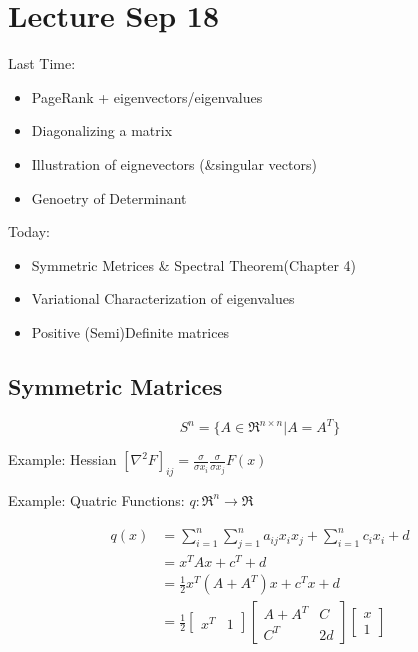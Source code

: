 \section{Lecture Sep 18}

Last Time:

\begin{itemize}
	\item PageRank + eigenvectors/eigenvalues
	
	\item Diagonalizing a matrix
	
	\item Illustration of eignevectors (\&singular vectors)
	
	\item Genoetry of Determinant 
\end{itemize}


Today:

\begin{itemize}
	\item Symmetric Metrices \& Spectral Theorem(Chapter 4)
	
	\item Variational Characterization of eigenvalues
	
	\item Positive (Semi)Definite matrices
\end{itemize}

\subsection{Symmetric Matrices}

\begin{equation*}
S^n = \{A\in \Re^{n\times n} | A = A^T \}
\end{equation*}

Example: Hessian $[\nabla^2 F]_{ij} = \frac{\sigma}{\sigma x_i}\frac{\sigma}{\sigma x_j}F(x)$


Example: Quatric Functions: $q: \Re^n \rightarrow \Re$

\begin{align*}
q(x) &= \sum^n_{i=1}\sum^n_{j=1}a_{ij}x_ix_j + \sum^n_{i=1}c_ix_i + d\\
&= x^TAx + c^T + d\\
&= \frac{1}{2}x^T(A + A^T)x + c^Tx + d\\
&= \frac{1}{2}
\begin{bmatrix}%
x^T& 1
\end{bmatrix}
\begin{bmatrix}%
A + A^T & C\\
C^T & 2d
\end{bmatrix}
\begin{bmatrix}%
x\\
1
\end{bmatrix}
\end{align*}


